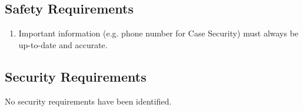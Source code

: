 \documentclass[pdftex,12pt,letter]{article}
\begin{document}
\subsection{Safety Requirements}
\begin{enumerate}[SR-1:]
\item Important information (e.g. phone number for Case Security) must always be up-to-date and accurate.
\end{enumerate}
\subsection{Security Requirements}
No security requirements have been identified.

\end{document}
